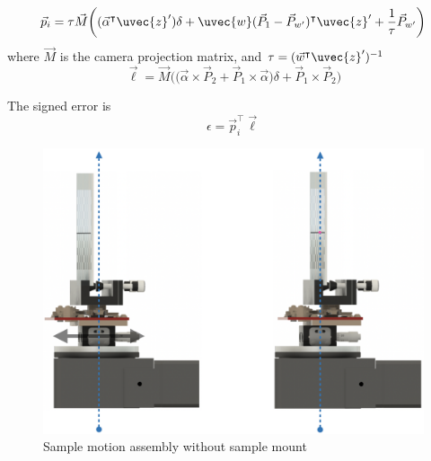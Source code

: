 \begin{equation}
    \vec{p}_i = \tau \vec{M}\bigg((\vec{\alpha}^\intercal \uvec{z}') \delta + \uvec{w}(\vec{P}_1 - \vec{P}_{w'})^\intercal \uvec{z}'  + \frac{1}{\tau} \vec{P}_{w'} \bigg)
\end{equation}
where $\vec{M}$ is the camera projection matrix, and $\tau = (\vec{w}^\intercal \uvec{z}')^{-1}$
\begin{equation}
    \vec{\ell} = \vec{M} \Big(\big(\vec{\alpha} \times \vec{P}_2 + \vec{P}_1 \times \vec{\alpha}\big)\delta + \vec{P}_1 \times \vec{P}_2 \Big)
\end{equation}

The signed error is
\begin{equation}
    \epsilon = \vec{p}^\intercal_i \vec{\ell}
\end{equation}

\begin{figure}
    \centering
    \includegraphics[width=0.5\linewidth]{figures/compact_alignment.png}
    \caption{Sample motion assembly without sample mount}
    \label{fig:sample_motion_assy}
\end{figure}

